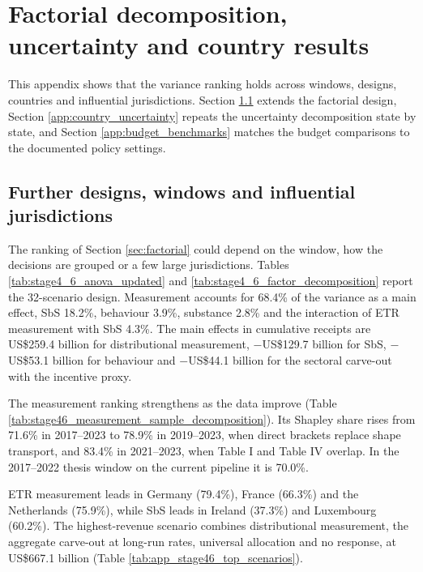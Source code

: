 \documentclass[11pt,a4paper]{article}
\newcommand{\usd}{US\$}
\begin{document}
\clearpage
\section{Factorial decomposition, uncertainty and country results}\label{app:decomposition}

This appendix shows that the variance ranking holds across windows, designs, countries and influential jurisdictions. Section \ref{app:factorial_ext} extends the factorial design, Section \ref{app:country_uncertainty} repeats the uncertainty decomposition state by state, and Section \ref{app:budget_benchmarks} matches the budget comparisons to the documented policy settings.

\subsection{Further designs, windows and influential jurisdictions}\label{app:factorial_ext}

The ranking of Section \ref{sec:factorial} could depend on the window, how the decisions are grouped or a few large jurisdictions. Tables \ref{tab:stage4_6_anova_updated} and \ref{tab:stage4_6_factor_decomposition} report the 32-scenario design. Measurement accounts for 68.4\% of the variance as a main effect, SbS 18.2\%, behaviour 3.9\%, substance 2.8\% and the interaction of ETR measurement with SbS 4.3\%. The main effects in cumulative receipts are \usd259.4 billion for distributional measurement, $-$\usd129.7 billion for SbS, $-$\usd53.1 billion for behaviour and $-$\usd44.1 billion for the sectoral carve-out with the incentive proxy.





The measurement ranking strengthens as the data improve (Table \ref{tab:stage46_measurement_sample_decomposition}). Its Shapley share rises from 71.6\% in 2017–2023 to 78.9\% in 2019–2023, when direct brackets replace shape transport, and 83.4\% in 2021–2023, when Table I and Table IV overlap. In the 2017–2022 thesis window on the current pipeline it is 70.0\%.




ETR measurement leads in Germany (79.4\%), France (66.3\%) and the Netherlands (75.9\%), while SbS leads in Ireland (37.3\%) and Luxembourg (60.2\%). The highest-revenue scenario combines distributional measurement, the aggregate carve-out at long-run rates, universal allocation and no response, at \usd667.1 billion (Table \ref{tab:app_stage46_top_scenarios}).
\end{document}
